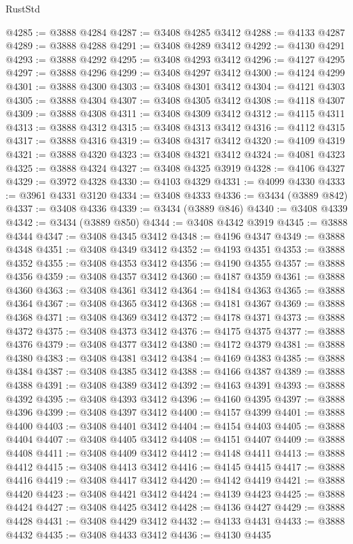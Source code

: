 \begin{lexlean}{RustStd}
\begin{coremodule}
@4285 := @3888 @4284
@4287 := @3408 @4285 @3412
@4288 := @4133 @4287
@4289 := @3888 @4288
@4291 := @3408 @4289 @3412
@4292 := @4130 @4291
@4293 := @3888 @4292
@4295 := @3408 @4293 @3412
@4296 := @4127 @4295
@4297 := @3888 @4296
@4299 := @3408 @4297 @3412
@4300 := @4124 @4299
@4301 := @3888 @4300
@4303 := @3408 @4301 @3412
@4304 := @4121 @4303
@4305 := @3888 @4304
@4307 := @3408 @4305 @3412
@4308 := @4118 @4307
@4309 := @3888 @4308
@4311 := @3408 @4309 @3412
@4312 := @4115 @4311
@4313 := @3888 @4312
@4315 := @3408 @4313 @3412
@4316 := @4112 @4315
@4317 := @3888 @4316
@4319 := @3408 @4317 @3412
@4320 := @4109 @4319
@4321 := @3888 @4320
@4323 := @3408 @4321 @3412
@4324 := @4081 @4323
@4325 := @3888 @4324
@4327 := @3408 @4325 @3919
@4328 := @4106 @4327
@4329 := @3972 @4328
@4330 := @4103 @4329
@4331 := @4099 @4330
@4333 := @3961 @4331 @3120
@4334 := @3408 @4333
@4336 := @3434 (@3889 @842)
@4337 := @3408 @4336
@4339 := @3434 (@3889 @846)
@4340 := @3408 @4339
@4342 := @3434 (@3889 @850)
@4344 := @3408 @4342 @3919
@4345 := @3888 @4344
@4347 := @3408 @4345 @3412
@4348 := @4196 @4347
@4349 := @3888 @4348
@4351 := @3408 @4349 @3412
@4352 := @4193 @4351
@4353 := @3888 @4352
@4355 := @3408 @4353 @3412
@4356 := @4190 @4355
@4357 := @3888 @4356
@4359 := @3408 @4357 @3412
@4360 := @4187 @4359
@4361 := @3888 @4360
@4363 := @3408 @4361 @3412
@4364 := @4184 @4363
@4365 := @3888 @4364
@4367 := @3408 @4365 @3412
@4368 := @4181 @4367
@4369 := @3888 @4368
@4371 := @3408 @4369 @3412
@4372 := @4178 @4371
@4373 := @3888 @4372
@4375 := @3408 @4373 @3412
@4376 := @4175 @4375
@4377 := @3888 @4376
@4379 := @3408 @4377 @3412
@4380 := @4172 @4379
@4381 := @3888 @4380
@4383 := @3408 @4381 @3412
@4384 := @4169 @4383
@4385 := @3888 @4384
@4387 := @3408 @4385 @3412
@4388 := @4166 @4387
@4389 := @3888 @4388
@4391 := @3408 @4389 @3412
@4392 := @4163 @4391
@4393 := @3888 @4392
@4395 := @3408 @4393 @3412
@4396 := @4160 @4395
@4397 := @3888 @4396
@4399 := @3408 @4397 @3412
@4400 := @4157 @4399
@4401 := @3888 @4400
@4403 := @3408 @4401 @3412
@4404 := @4154 @4403
@4405 := @3888 @4404
@4407 := @3408 @4405 @3412
@4408 := @4151 @4407
@4409 := @3888 @4408
@4411 := @3408 @4409 @3412
@4412 := @4148 @4411
@4413 := @3888 @4412
@4415 := @3408 @4413 @3412
@4416 := @4145 @4415
@4417 := @3888 @4416
@4419 := @3408 @4417 @3412
@4420 := @4142 @4419
@4421 := @3888 @4420
@4423 := @3408 @4421 @3412
@4424 := @4139 @4423
@4425 := @3888 @4424
@4427 := @3408 @4425 @3412
@4428 := @4136 @4427
@4429 := @3888 @4428
@4431 := @3408 @4429 @3412
@4432 := @4133 @4431
@4433 := @3888 @4432
@4435 := @3408 @4433 @3412
@4436 := @4130 @4435

\end{coremodule}
\end{lexlean}

